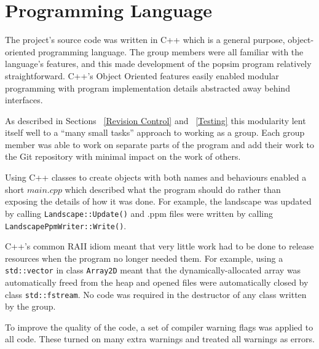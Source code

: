 \section{Programming Language}
\label{Programming Language}

The project's source code was written in C++ which is a general purpose, object-oriented programming language.
The group members were all familiar with the language's features, and this made development of the popsim program relatively straightforward.
C++'s Object Oriented features easily enabled modular programming with program implementation details abstracted away behind interfaces.

As described in Sections ~\ref{Revision Control} and ~\ref{Testing} this modularity lent itself well to a ``many small tasks'' approach to working as a group.
Each group member was able to work on separate parts of the program and add their work to the Git repository with minimal impact on the work of others.

Using C++ classes to create objects with both names and behaviours enabled a short $main.cpp$ which described what the program should do rather than exposing the details of how it was done.
For example, the landscape was updated by calling \texttt{Landscape::Update()} and .ppm files were written by calling \texttt{LandscapePpmWriter::Write()}.

C++'s common RAII idiom meant that very little work had to be done to release resources when the program no longer needed them.
For example, using a \texttt{std::vector} in class \texttt{Array2D} meant that the dynamically-allocated array was automatically freed from the heap and opened files were automatically closed by class \texttt{std::fstream}.
No code was required in the destructor of any class written by the group.

To improve the quality of the code, a set of compiler warning flags was applied to all code.  These turned on many extra warnings and treated all warnings as errors.
